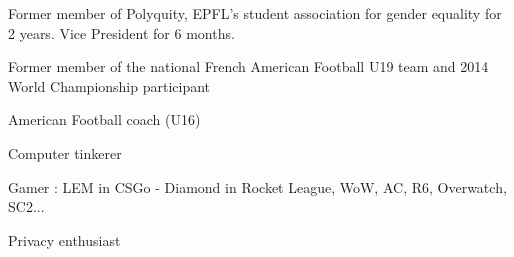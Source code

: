 


\begin{cventries}
	
	
	\cventry
	{} %
	{}
	{}
	{}
	{ %
		\begin{cvitems}
			\item {Former member of Polyquity, EPFL's student association for gender equality for 2 years. Vice President for 6 months.}
			\item {Former member of the national French American Football U19 team and 2014 World Championship participant}
			\item{American Football coach (U16)}
			\item {Computer tinkerer}
			\item {Gamer : LEM in CSGo - Diamond in Rocket League, WoW, AC, R6, Overwatch, SC2...}
			\item Privacy enthusiast
		\end{cvitems}
	}
	
	
	
	
\end{cventries}